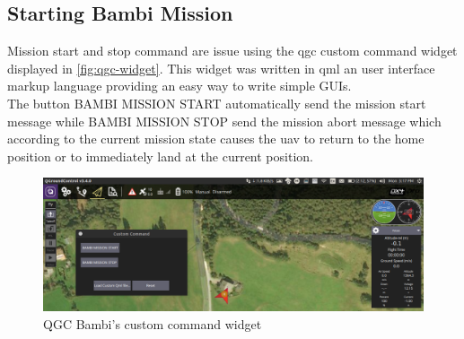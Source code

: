 \subsection{Starting Bambi Mission} %
\label{sub:starting_bambi_mission}
Mission start and stop command are issue using the \acrshort{qgc} custom command widget displayed in \autoref{fig:qgc-widget}. This widget was written in \acrfull{qml} an user interface markup language providing an easy way to write simple GUIs.\\
The button \textsf{BAMBI MISSION START} automatically send the mission start message while \textsf{BAMBI MISSION STOP} send the mission abort message which according to the current mission state causes the \acrshort{uav} to return to the home position or to immediately land at the current position.
\begin{figure}[ht]
  \centering
  \includegraphics[width=.9\linewidth]{figures/C3/simulation/qgc-widget.png}
  \caption{QGC Bambi's custom command widget}
  \label{fig:qgc-widget}
\end{figure}

